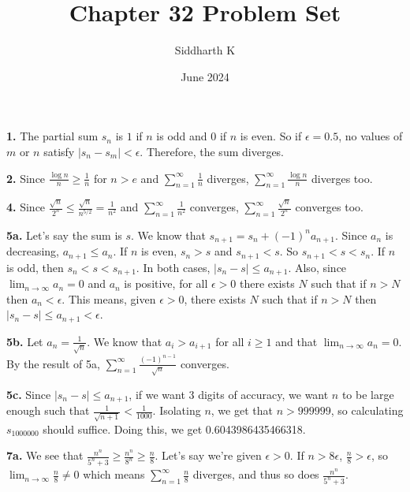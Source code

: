 \documentclass{article}
\title{Chapter 32 Problem Set}
\author{Siddharth K}
\date{June 2024}
\begin{document}
\maketitle

\textbf{1.} The partial sum $s_n$ is $1$ if $n$ is odd and $0$ if $n$ is even. So if $\epsilon = 0.5$, no values of $m$ or $n$ satisfy $|s_n - s_m| < \epsilon$. Therefore, the sum diverges.
\newline

\textbf{2.} Since $\frac{\log n}{n} \ge \frac{1}{n}$ for $n > e$ and $\sum_{n = 1}^\infty \frac{1}{n}$ diverges, $\sum_{n = 1}^\infty \frac{\log n}{n}$ diverges too.
\newline

\textbf{4.} Since $\frac{\sqrt{n}}{2^n} \le \frac{\sqrt{n}}{n^{5/2}} = \frac{1}{n^2}$ and $\sum_{n = 1}^\infty \frac{1}{n^2}$ converges, $\sum_{n = 1}^\infty \frac{\sqrt{n}}{2^n}$ converges too.
\newline

\textbf{5a.} Let's say the sum is $s$. We know that $s_{n + 1} = s_n + (-1)^na_{n + 1}$. Since $a_n$ is decreasing, $a_{n + 1} \le a_n$. If $n$ is even, $s_n > s$ and $s_{n + 1} < s$. So $s_{n + 1} < s < s_n$. If $n$ is odd, then $s_n < s < s_{n + 1}$. In both cases, $|s_n - s| \le a_{n + 1}$. Also, since $\lim_{n \to \infty} a_n = 0$ and $a_n$ is positive, for all $\epsilon > 0$ there exists $N$ such that if $n > N$ then $a_n < \epsilon$. This means, given $\epsilon > 0$, there exists $N$ such that if $n > N$ then $|s_n - s| \le a_{n + 1} < \epsilon$.
\newline

\textbf{5b.} Let $a_n = \frac{1}{\sqrt{n}}$. We know that $a_i > a_{i + 1}$ for all $i \ge 1$ and that $\lim_{n \to \infty} a_n = 0$. By the result of 5a, $\sum_{n = 1}^\infty \frac{(-1)^{n - 1}}{\sqrt{n}}$ converges.
\newline

\textbf{5c.} Since $|s_n - s| \le a_{n + 1}$, if we want 3 digits of accuracy, we want $n$ to be large enough such that $\frac{1}{\sqrt{n + 1}} < \frac{1}{1000}$. Isolating $n$, we get that $n > 999999$, so calculating $s_{1000000}$ should suffice. Doing this, we get 0.6043986435466318.
\newline

\textbf{7a.} We see that $\frac{n^n}{5^n + 3} \ge \frac{n^n}{8^n} \ge \frac{n}{8}$. Let's say we're given $\epsilon > 0$. If $n > 8\epsilon$, $\frac{n}{8} > \epsilon$, so $\lim_{n\to \infty}\frac{n}{8} \neq 0$ which means $\sum_{n = 1}^\infty \frac{n}{8}$ diverges, and thus so does $\frac{n^n}{5^n + 3}$.
\newline
\end{document}
